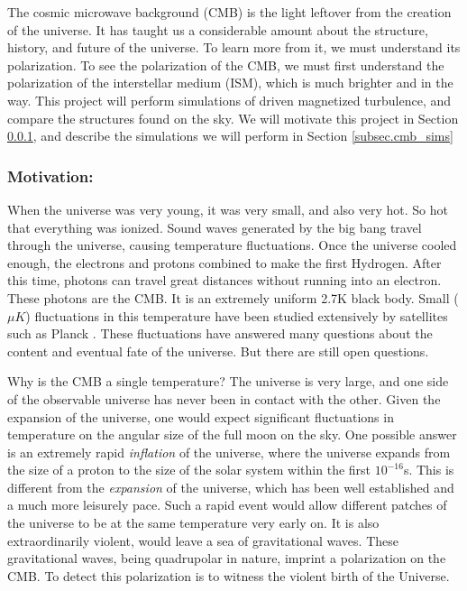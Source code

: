 The cosmic microwave background (CMB) is the light leftover from the creation of
the universe.  It has taught us a considerable amount about the structure,
history, and future of the
universe.  To learn more from it, we must understand its polarization.  To see
the polarization of the CMB, we must first understand the polarization of the
interstellar medium (ISM), which is much brighter and in the way.  This project
will perform simulations of driven magnetized turbulence, and compare the
structures found on the sky.
We will
motivate this project in Section \ref{subsec.cmb_motivate}, and describe the
simulations we will perform in Section \ref{subsec.cmb_sims}

\subsubsection{Motivation: \nameCMB}
\label{subsec.cmb_motivate}

When the universe was very young, it was very small, and also very hot.  So hot
that everything was ionized.  Sound waves generated by the big bang travel through
the universe, causing temperature fluctuations.  Once the universe cooled
enough, the electrons and protons combined to make the first Hydrogen.  After
this time, photons can travel great distances without running into an electron.
These photons are the CMB.  It is an extremely uniform 2.7K black body.  Small
($\mu K$) fluctuations in this temperature have been studied extensively by
satellites such as Planck \citep{Planck2018VI20}. These fluctuations have answered many
questions about the content and eventual fate of the universe.  But there are
still open questions.

Why is the CMB a single temperature?  The
universe is very large, and one side of the observable universe has never been
in contact with the other.  Given the expansion of the universe, one would
expect significant fluctuations in temperature on the angular size of the full moon on the sky.
One possible answer is an extremely rapid
\emph{inflation} of the universe, where the universe expands from the size of a
proton to the size of the solar system within the first $10^{-16}$s.  This is
different from the \emph{expansion} of the universe, which has been well
established and a much more leisurely pace.  Such a
rapid event would allow different patches of the universe to be at the same
temperature very early on.  
It is also extraordinarily violent, would leave a sea of gravitational waves.  These gravitational
waves, being quadrupolar in nature, imprint a polarization on the CMB. To detect
this polarization is to witness the violent birth of the Universe.

